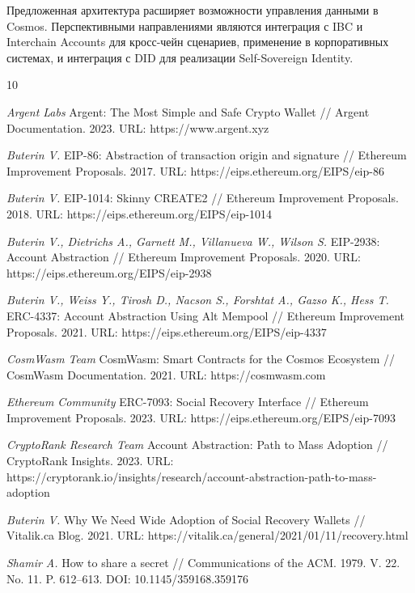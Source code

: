 \documentclass[12pt]{a&t}
\begin{document}
Предложенная архитектура расширяет возможности управления данными в Cosmos. Перспективными направлениями являются интеграция с IBC и Interchain Accounts для кросс-чейн сценариев, применение в корпоративных системах, и интеграция с DID для реализации Self-Sovereign Identity.



\begin{thebibliography}{10}

{\it Argent Labs}
Argent: The Most Simple and Safe Crypto Wallet // 
Argent Documentation. 2023. URL: https://www.argent.xyz

{\it Buterin V.}
EIP-86: Abstraction of transaction origin and signature // 
Ethereum Improvement Proposals. 2017. URL: https://eips.ethereum.org/EIPS/eip-86

{\it Buterin V.}
EIP-1014: Skinny CREATE2 // 
Ethereum Improvement Proposals. 2018. URL: https://eips.ethereum.org/EIPS/eip-1014

{\it Buterin V., Dietrichs A., Garnett M., Villanueva W., Wilson S.}
EIP-2938: Account Abstraction // 
Ethereum Improvement Proposals. 2020. URL: https://eips.ethereum.org/EIPS/eip-2938

{\it Buterin V., Weiss Y., Tirosh D., Nacson S., Forshtat A., Gazso K., Hess T.}
ERC-4337: Account Abstraction Using Alt Mempool // 
Ethereum Improvement Proposals. 2021. URL: https://eips.ethereum.org/EIPS/eip-4337

{\it CosmWasm Team}
CosmWasm: Smart Contracts for the Cosmos Ecosystem // 
CosmWasm Documentation. 2021. URL: https://cosmwasm.com

{\it Ethereum Community}
ERC-7093: Social Recovery Interface // 
Ethereum Improvement Proposals. 2023. URL: https://eips.ethereum.org/EIPS/eip-7093

{\it CryptoRank Research Team}
Account Abstraction: Path to Mass Adoption // 
CryptoRank Insights. 2023. URL: https://cryptorank.io/insights/research/account-abstraction-path-to-mass-adoption

{\it Buterin V.}
Why We Need Wide Adoption of Social Recovery Wallets // 
Vitalik.ca Blog. 2021. URL: https://vitalik.ca/general/2021/01/11/recovery.html

{\it Shamir A.}
How to share a secret // 
Communications of the ACM. 1979. V. 22. No. 11. P. 612--613. DOI: 10.1145/359168.359176


\end{thebibliography}
\end{document}
